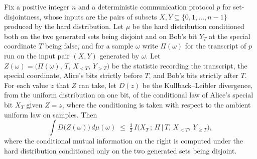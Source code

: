 \begin{theorem}
\label{CommunicationComplexity.Functions.Disjointness.RandomizedLowerBound.integral_xFiberKL_disjointSpecialYFalse_le_three_halves_mul_aliceInfoTerm}
\leanok
{}
Fix a positive integer $n$ and a deterministic communication protocol $p$ for
set-disjointness, whose inputs are the pairs of subsets $X, Y \subseteq \{0, 1, \dots,
n-1\}$ produced by the hard distribution. Let $\mu$ be the hard distribution conditioned
both on the two generated sets being disjoint and on Bob's bit $Y_T$ at the special
coordinate $T$ being $\mathrm{false}$, and for a sample $\omega$ write $\Pi(\omega)$ for
the transcript of $p$ run on the input pair $(X, Y)$ generated by $\omega$. Let
$Z(\omega) = \big(\Pi(\omega),\, T,\, X_{<T},\, Y_{>T}\big)$ be the statistic recording
the transcript, the special coordinate, Alice's bits strictly before $T$, and Bob's bits
strictly after $T$. For each value $z$ that $Z$ can take, let $D(z)$ be the
Kullback–Leibler divergence, from the uniform distribution on one bit, of the
conditional law of Alice's special bit $X_T$ given $Z = z$, where the conditioning is
taken with respect to the ambient uniform law on samples. Then
\[
\int D\big(Z(\omega)\big)\, d\mu(\omega) \;\le\; \tfrac{3}{2}\, I\!\big(X_T \,;\, \Pi
\,\big|\, T,\, X_{<T},\, Y_{\ge T}\big),
\]
where the conditional mutual information on the right is computed under the hard
distribution conditioned only on the two generated sets being disjoint.
\end{theorem}

